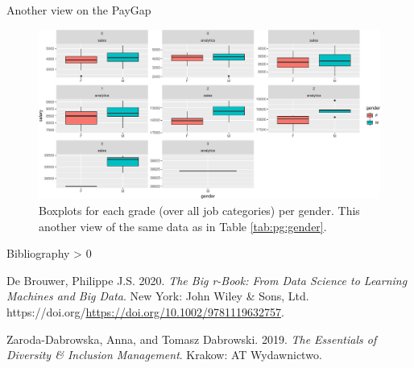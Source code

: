 \documentclass[
  ignorenonframetext,
  usenames,
  dvipsnames]{beamer}
\newlength{\cslhangindent}
\newenvironment{CSLReferences}[2] %
 {%
  \setlength{\parindent}{0pt}
  \ifodd #1 \everypar{\setlength{\hangindent}{\cslhangindent}}\ignorespaces\fi
  \ifnum #2 > 0
  \setlength{\parskip}{#2\baselineskip}
  \fi
 }%
 {}
\begin{document}
\begin{frame}{Another view on the PayGap}
\protect\hypertarget{another-view-on-the-paygap}{}
\begin{figure}
\centering
\includegraphics{team_slides_files/figure-beamer/otherPayGapGender-1.pdf}
\caption{Boxplots for each grade (over all job categories) per gender.
This another view of the same data as in Table \ref{tab:pg:gender}.}
\end{figure}
\end{frame}

\begin{frame}{Bibliography}
\protect\hypertarget{bibliography}{}
\hypertarget{refs}{}
\begin{CSLReferences}{1}{0}
\leavevmode\hypertarget{ref-debrouwer2020}{}%
De Brouwer, Philippe J.S. 2020. \emph{The Big r-Book: From Data Science
to Learning Machines and Big Data}. New York: John Wiley \& Sons, Ltd.
https://doi.org/\url{https://doi.org/10.1002/9781119632757}.

\leavevmode\hypertarget{ref-diversityhub2019}{}%
Zaroda-Dabrowska, Anna, and Tomasz Dabrowski. 2019. \emph{The Essentials
of Diversity \& Inclusion Management}. Krakow: AT Wydawnictwo.

\end{CSLReferences}
\end{frame}
\end{document}
